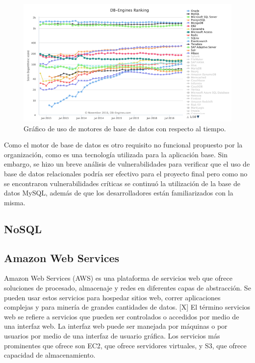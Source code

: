 \begin{figure}[H]
\centering
\includegraphics[width=125mm,scale=1]{Figuras/tecnologias/rank_db_2}
\caption{Gráfico de uso de motores de base de datos con respecto al tiempo.}
  \label{graph_db_2}
\end{figure}

Como el motor de base de datos es otro requisito no funcional propuesto por la organización, como es una tecnología utilizada para la aplicación base. Sin embargo, se hizo un breve análisis de vulnerabilidades para verificar que el uso de base de datos relacionales podría ser efectivo para el proyecto final pero como no se encontraron vulnerabilidades críticas se continuó la utilización de la base de datos MySQL, además de que los desarrolladores están familiarizados con la misma.

\subsection{NoSQL}

\subsection{Amazon Web Services}
Amazon Web Services (AWS) es una plataforma de servicios web que ofrece soluciones de procesado, almacenaje y redes en diferentes capas de abstracción. Se pueden usar estos servicios para hospedar sitios web, correr aplicaciones complejas y para minería de grandes cantidades de datos. [X] El término servicios web se refiere a servicios que pueden ser controlados o accedidos por medio de una interfaz web. La interfaz web puede ser manejada por máquinas o por usuarios por medio de una interfaz de usuario gráfica. Los servicios más prominentes que ofrece son EC2, que ofrece servidores virtuales, y S3, que ofrece capacidad de almacenamiento.

